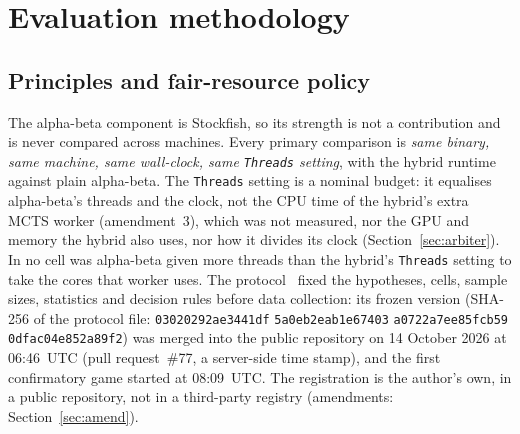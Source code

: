 \documentclass{article}
\newif\ifanon
\newcommand{\depositcite}{\ifanon\cite{anonarchive}\else\cite{zenodo}\fi}
\begin{document}
\section{Evaluation methodology}
\label{sec:method}

\subsection{Principles and fair-resource policy}
The alpha-beta component is Stockfish, so its strength is not a contribution and is never compared across machines. Every primary comparison is \emph{same binary, same machine, same wall-clock, same \texttt{Threads} setting}, with the hybrid runtime against plain alpha-beta. The \texttt{Threads} setting is a nominal budget: it equalises alpha-beta's threads and the clock, not the CPU time of the hybrid's extra MCTS worker (amendment~3), which was not measured, nor the GPU and memory the hybrid also uses, nor how it divides its clock (Section~\ref{sec:arbiter}). In no cell was alpha-beta given more threads than the hybrid's \texttt{Threads} setting to take the cores that worker uses. The protocol~\depositcite{} fixed the hypotheses, cells, sample sizes, statistics and decision rules before data collection: its frozen version (SHA-256 of the protocol file: \texttt{03020292ae3441df} \texttt{5a0eb2eab1e67403} \texttt{a0722a7ee85fcb59} \texttt{0dfac04e852a89f2}) was merged into the public repository on 14 October 2026 at 06:46~UTC\ifanon\else{} (pull request~\#77, a server-side time stamp)\fi, and the first confirmatory game started at 08:09~UTC. The registration is the author's own, in a public repository, not in a third-party registry (amendments: Section~\ref{sec:amend}).
\end{document}
